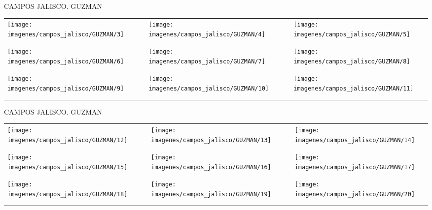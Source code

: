 \documentclass[10pt,letter]{report}
\begin{document}
\begin{center}
	\textcolor{principal}{CAMPOS JALISCO. GUZMAN}
\end{center}
\begin{table}[H]
\centering

\footnotesize
	\begin{tabular}{m{5cm}m{1cm}m{5cm}m{1cm}m{5cm}}
	
	\texttt{[image: imagenes/campos\_jalisco/GUZMAN/3]}&&\texttt{[image: imagenes/campos\_jalisco/GUZMAN/4]}&&\texttt{[image: imagenes/campos\_jalisco/GUZMAN/5]}\\
	\\
	\\
	\texttt{[image: imagenes/campos\_jalisco/GUZMAN/6]}&&\texttt{[image: imagenes/campos\_jalisco/GUZMAN/7]}&&\texttt{[image: imagenes/campos\_jalisco/GUZMAN/8]}\\
	\\
	\\
	\texttt{[image: imagenes/campos\_jalisco/GUZMAN/9]}&&\texttt{[image: imagenes/campos\_jalisco/GUZMAN/10]}&&\texttt{[image: imagenes/campos\_jalisco/GUZMAN/11]}\\
	\\	
	\\
	
	\end{tabular}
	
\end{table}
\newpage

\begin{center}
	\textcolor{principal}{CAMPOS JALISCO. GUZMAN}
\end{center}
\begin{table}[H]
\centering

\footnotesize
	\begin{tabular}{m{5cm}m{1cm}m{5cm}m{1cm}m{5cm}}
	
	\texttt{[image: imagenes/campos\_jalisco/GUZMAN/12]}&&\texttt{[image: imagenes/campos\_jalisco/GUZMAN/13]}&&\texttt{[image: imagenes/campos\_jalisco/GUZMAN/14]}\\
	\\
	\\
	\texttt{[image: imagenes/campos\_jalisco/GUZMAN/15]}&&\texttt{[image: imagenes/campos\_jalisco/GUZMAN/16]}&&\texttt{[image: imagenes/campos\_jalisco/GUZMAN/17]}\\
	\\
	\\
	\texttt{[image: imagenes/campos\_jalisco/GUZMAN/18]}&&\texttt{[image: imagenes/campos\_jalisco/GUZMAN/19]}&&\texttt{[image: imagenes/campos\_jalisco/GUZMAN/20]}\\
	\\	
	\\
	
	\end{tabular}
	
\end{table}
\newpage
\end{document}
